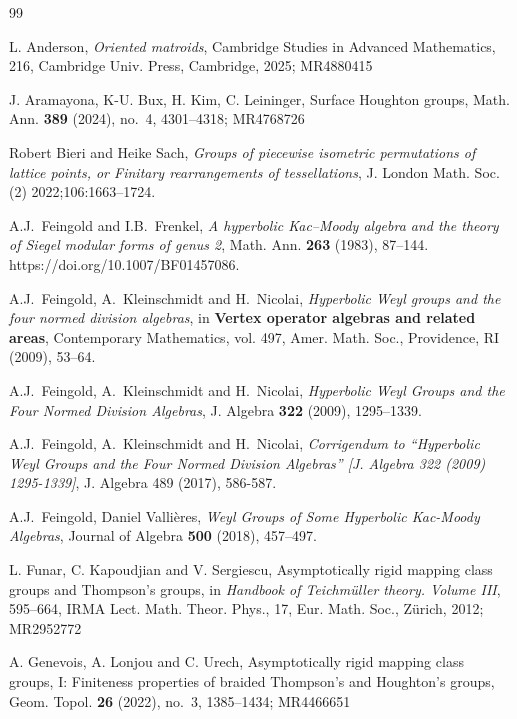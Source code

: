 \documentclass[11pt]{amsart}
\numberwithin{table}{section}
\numberwithin{figure}{section}
\theoremstyle{remark}
\begin{document}
\begin{thebibliography}{99}

 L. Anderson, {\it Oriented matroids}, Cambridge
  Studies in Advanced Mathematics, 216, Cambridge Univ. Press,
  Cambridge, 2025; MR4880415

   J. Aramayona, K-U. Bux, H. Kim, C. Leininger, Surface Houghton groups, Math. Ann. {\bf 389} (2024), no.~4, 4301--4318; MR4768726

 Robert Bieri and Heike Sach, {\sl Groups of piecewise
    isometric permutations of lattice points, or Finitary
    rearrangements of tessellations}, J. London Math. Soc. (2)
  2022;106:1663--1724.

 A.J.~Feingold and I.B.~Frenkel, {\sl A hyperbolic
    Kac--Moody algebra and the theory of Siegel modular forms of genus
    2}, Math. Ann. {\bf 263} (1983),
  87--144. {https://doi.org/10.1007/BF01457086}.
 
 A.J.~Feingold, A.~Kleinschmidt and H.~Nicolai, {\sl
    Hyperbolic Weyl groups and the four normed division algebras}, in
  {\bf Vertex operator algebras and related areas}, Contemporary
  Mathematics, vol. 497, Amer. Math. Soc., Providence, RI (2009),
  53--64.

 A.J.~Feingold, A.~Kleinschmidt and H.~Nicolai,
  {\sl Hyperbolic Weyl Groups and the Four Normed Division Algebras},
  J. Algebra {\bf 322} (2009), 1295--1339.

 A.J.~Feingold, A.~Kleinschmidt and H.~Nicolai,
  {\sl Corrigendum to ``Hyperbolic Weyl Groups and the Four Normed
    Division Algebras'' [J. Algebra 322 (2009) 1295-1339]}, J. Algebra
  489 (2017), 586-587.

 A.J.~Feingold, Daniel Valli\`eres, {\sl Weyl Groups of
    Some Hyperbolic Kac-Moody Algebras}, Journal of Algebra {\bf 500}
  (2018), 457--497.

  L. Funar, C. Kapoudjian and V. Sergiescu,
  Asymptotically rigid mapping class groups and Thompson's groups, in
  {\it Handbook of Teichm\"uller theory. Volume III}, 595--664, IRMA
  Lect. Math. Theor. Phys., 17, Eur. Math. Soc., Z\"urich, 2012;
  MR2952772

 A. Genevois, A. Lonjou and C. Urech, Asymptotically
  rigid mapping class groups, I: Finiteness properties of braided
  Thompson's and Houghton's groups, Geom. Topol. {\bf 26} (2022),
  no.~3, 1385--1434; MR4466651


\end{thebibliography}
\end{document}
